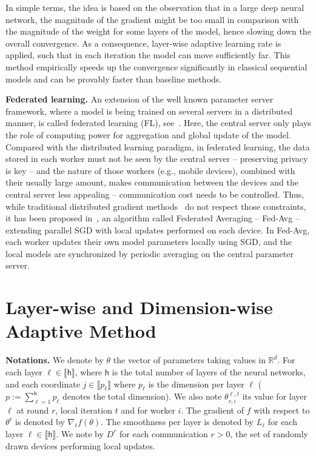 \documentclass[11pt]{article}
\def\rset{\ensuremath{\mathbb{R}}}
\newcommand{\inter}{\llbracket n \rrbracket}
\def\tot{\mathsf{h}}
\begin{document}
In simple terms, the idea is based on the observation that in a large deep neural network, the magnitude of the gradient might be too small in comparison with the magnitude of the weight for some layers of the model, hence slowing down the overall convergence. 
As a consequence, layer-wise adaptive learning rate is applied, such that in each iteration the model can move sufficiently far. 
This method empirically speeds up the convergence significantly in classical sequential models and can be provably faster than baseline methods.


\vspace{0.1in}
\noindent\textbf{Federated learning.}
An extension of the well known parameter server framework, where a model is being trained on several servers in a distributed manner, is called federated learning (FL), see~\citet{konevcny2016federated}.
Here, the central server only plays the role of computing power for aggregation and global update of the model.
Compared with the distributed learning paradigm, in federated learning, the data stored in each worker must not be seen by the central server -- preserving privacy is key -- and the nature of those workers (e.g., mobile devices), combined with their usually large amount, makes communication between the devices and the central server less appealing -- communication cost needs to be controlled.
Thus, while traditional distributed gradient methods~\citep{recht2011hogwild,li2014scaling,zhao2020distributed} do not respect those constraints, it has been proposed in~\citet{mcmahan2017communication}, an algorithm called Federated Averaging -- Fed-Avg -- extending parallel SGD with local updates performed on each device. 
In Fed-Avg, each worker updates their own model parameters locally using SGD, and the local models are synchronized by periodic averaging on the central parameter server.

\section{Layer-wise and Dimension-wise Adaptive Method}\label{sec:main}

\noindent\textbf{Notations.} We denote by $\theta$ the vector of parameters taking values in $\rset^d$. 
For each layer $\ell \in \llbracket \tot \rrbracket$, where $\tot$ is the total number of layers of the neural networks, and each coordinate $j \in \llbracket p_\ell \rrbracket$ where $p_\ell$ is the dimension per layer $\ell$ ($p := \sum_{\ell=1}^\tot p_\ell$ denotes the total dimension).
We also note $\theta_{r,i}^{\ell,t}$ its value for layer $\ell$ at round $r$, local iteration $t$ and for worker $i$.
The gradient of $f$ with respect to $\theta^\ell$ is denoted by $\nabla_{\ell} f(\theta)$.
The smoothness per layer is denoted by $L_\ell$ for each layer $\ell \in \llbracket \tot \rrbracket$.
We note by $D^{r}$ for each communication $r>0$, the set of randomly drawn devices performing local updates.
\end{document}

